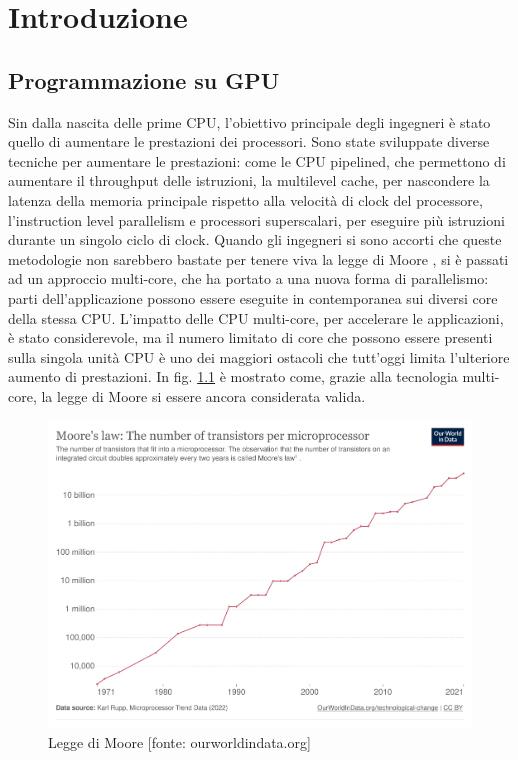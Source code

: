 \chapter{Introduzione}
\label{sec:intro}

\section[Programmazione su GPU]{Programmazione su GPU}

Sin dalla nascita delle prime \gls{CPU}, l'obiettivo principale degli ingegneri è stato quello di aumentare le prestazioni dei processori. Sono state sviluppate diverse tecniche per aumentare le prestazioni: come le \gls{CPU} pipelined, che permettono di aumentare il throughput delle istruzioni, la multilevel cache, per nascondere la latenza della memoria principale rispetto alla velocità di clock del processore, l'instruction level parallelism e processori superscalari, per eseguire più istruzioni durante un singolo ciclo di clock.
Quando gli ingegneri si sono accorti che queste metodologie non sarebbero bastate per tenere viva la legge di Moore \cite[]{Moore:law}, si è passati ad un approccio multi-core, che ha portato a una nuova forma di parallelismo: parti dell'applicazione possono essere eseguite in contemporanea sui diversi core della stessa \gls{CPU}. L'impatto delle \gls{CPU} multi-core, per accelerare le applicazioni, è stato considerevole, ma il numero limitato di core che possono essere presenti sulla singola unità \gls{CPU} è uno dei maggiori ostacoli che tutt'oggi limita l'ulteriore aumento di prestazioni. In fig. \ref{fig:moore_law} è mostrato come, grazie alla tecnologia multi-core, la legge di Moore si essere ancora considerata valida.

\begin{figure}[ht]
\centering
\includegraphics[width=.9\linewidth]{images/chapter1/moore_law.png}
\caption{Legge di Moore [fonte: ourworldindata.org]}
\label{fig:moore_law}
\end{figure}

